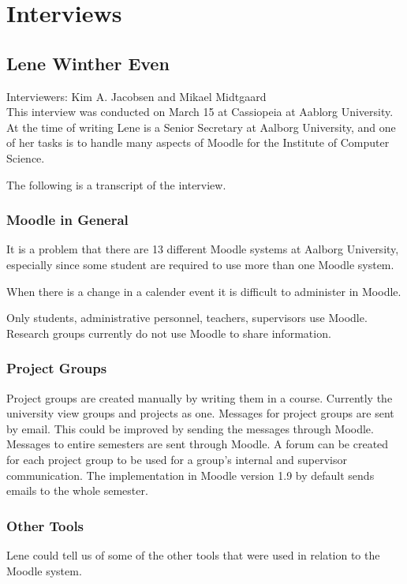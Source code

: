 \chapter{Interviews}

\section{Lene Winther Even}
\label{sec:lene}
Interviewers: Kim A. Jacobsen and Mikael Midtgaard\\


This interview was conducted on March 15\ths{} at Cassiopeia at Aablorg University.
At the time of writing Lene is a Senior Secretary at Aalborg University, and one of her tasks is to handle many aspects of Moodle for the Institute of Computer Science.

The following is a transcript of the interview.

\subsection*{Moodle in General}
It is a problem that there are 13 different Moodle systems at Aalborg University, especially since some student are required to use more than one Moodle system.

When there is a change in a calender event it is difficult to administer in Moodle.

Only students, administrative personnel, teachers, supervisors use Moodle.
Research groups currently do not use Moodle to share information.




\subsection*{Project Groups}
Project groups are created manually by writing them in a course.
Currently the university view groups and projects as one.
Messages for project groups are sent by email.
This could be improved by sending the messages through Moodle.
Messages to entire semesters are sent through Moodle.
A forum can be created for each project group to be used for a group's internal and supervisor communication.
The implementation in Moodle version 1.9 by default sends emails to the whole semester.




\subsection*{Other Tools}
Lene could tell us of some of the other tools that were used in relation to the Moodle system.

